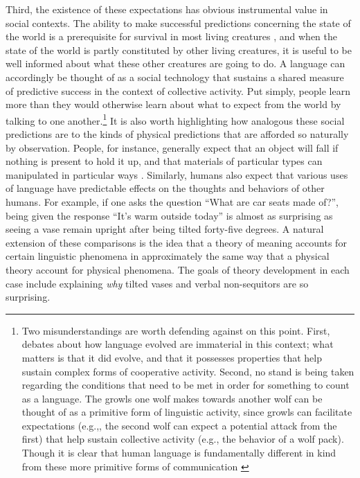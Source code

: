 Third, the existence of these expectations has obvious instrumental value in social contexts. The ability to make successful predictions concerning the state of the world is a prerequisite for survival in most living creatures \citep{clark:2013,Dennett:1987}, and when the state of the world is partly constituted by other living creatures, it is useful to be well informed about what these other creatures are going to do. A language can accordingly be thought of as a social technology that sustains a shared measure of predictive success in the context of collective activity. Put simply, people learn more than they would otherwise learn about what to expect from the world by talking to one another.\footnote{Two misunderstandings are worth defending against on this point. First, debates about how language evolved are immaterial in this context; what matters is that it did evolve, and that it possesses properties that help sustain complex forms of cooperative activity. Second, no stand is being taken regarding the conditions that need to be met in order for something to count as a language. The growls one wolf makes towards another wolf can be thought of as a primitive form of linguistic activity, since growls can facilitate expectations (e.g.,, the second wolf can expect a potential attack from the first) that help sustain collective activity (e.g., the behavior of a wolf pack). Though it is clear that human language is fundamentally different in kind from these more primitive forms of communication \citep{Harley:2014}} It is also worth highlighting how analogous these social predictions are to the kinds of physical predictions that are afforded so naturally by observation. People, for instance, generally expect that an object will fall if nothing is present to hold it up, and that materials of particular types can manipulated in particular ways \citep{Dennett:1987}. Similarly, humans also expect that various uses of language have predictable effects on the thoughts and behaviors of other humans. For example, if one asks the question ``What are car seats made of?'', being given the response ``It's warm outside today'' is almost as surprising as seeing a vase remain upright after being tilted forty-five degrees. A natural extension of these comparisons is the idea that a theory of meaning accounts for certain linguistic phenomena in approximately the same way that a physical theory account for physical phenomena. The goals of theory development in each case include explaining \textit{why} tilted vases and verbal non-sequitors are so surprising. 


